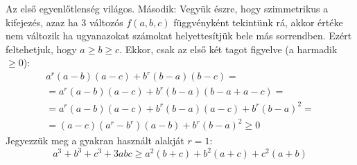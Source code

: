    Az első egyenlőtlenség világos. Második: Vegyük észre, hogy szimmetrikus a kifejezés, 
   azaz ha $3$ változós $f(a,b,c)$ függvényként tekintünk rá, akkor értéke nem változik ha 
   ugyanazokat számokat helyettesítjük bele más sorrendben. 
   Ezért feltehetjuk, hogy $a\ge b\ge c.$
   Ekkor, csak az első két tagot figyelve (a harmadik $\ge 0$):
   \begin{align*}
   a^{r}(a-b)(a-c)+b^{r}(b-a)(b-c)=\\
   =a^{r}(a-b)(a-c)+b^{r}(b-a)(b-a+a-c)=\\
   =a^{r}(a-b)(a-c)+b^{r}(b-a)(a-c)+b^{r}(b-a)^{2}=\\
   =(a-c)(a^{r}-b^{r})(a-b)+b^{r}(b-a)^{2}\ge 0
   \end{align*}
   Jegyezzük meg a gyakran használt alakját $r=1$:
   $$
   a^{3}+b^{3}+c^{3}+3abc \ge a^{2}(b+c)+b^{2}(a+c)+c^{2}(a+b)
   $$

